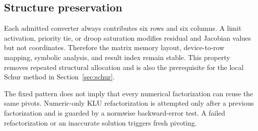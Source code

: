 \subsection{Structure preservation}

Each admitted converter always contributes six rows and six columns. A limit
activation, priority tie, or droop saturation modifies residual and Jacobian
values but not coordinates. Therefore the matrix memory layout, device-to-row
mapping, symbolic analysis, and result index remain stable. This property
removes repeated structural allocation and is also the prerequisite for the
local Schur method in Section~\ref{sec:schur}.

The fixed pattern does not imply that every numerical factorization can reuse
the same pivots. Numeric-only KLU refactorization is attempted only after a
previous factorization and is guarded by a normwise backward-error test. A
failed refactorization or an inaccurate solution triggers fresh pivoting.
